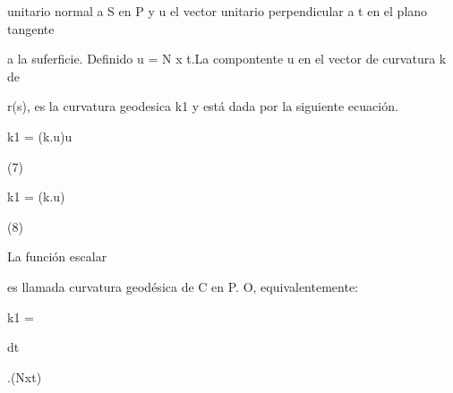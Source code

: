 \documentclass[a4paper,portrait,12pt]{article}
\begin{document}
\begin{flushleft}
unitario normal a S en P y u el vector unitario perpendicular a t en el plano tangente
\end{flushleft}


\begin{flushleft}
a la suferficie. Definido u = N x t.La compontente u en el vector de curvatura k de
\end{flushleft}


\begin{flushleft}
r(s), es la curvatura geodesica k1 y está dada por la siguiente ecuación.
\end{flushleft}


\begin{flushleft}
k1 = (k.u)u
\end{flushleft}





(7)





\begin{flushleft}
k1 = (k.u)
\end{flushleft}





(8)





\begin{flushleft}
La función escalar
\end{flushleft}





\begin{flushleft}
es llamada curvatura geodésica de C en P. O, equivalentemente:
\end{flushleft}





\begin{flushleft}
k1 =
\end{flushleft}





\begin{flushleft}
dt
\end{flushleft}


\begin{flushleft}
.(Nxt)
\end{flushleft}
\end{document}
